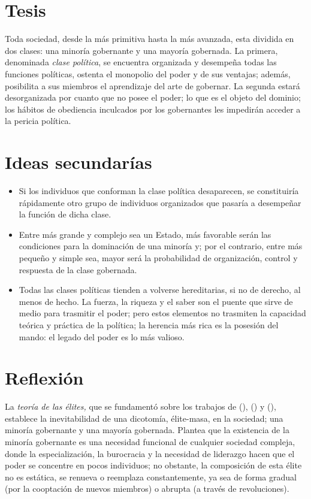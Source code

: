 \documentclass[
  letterpaper,
  DIV=11,
  numbers=noendperiod]{scrreprt}
\begin{document}
\section{Tesis}\label{tesis}

Toda sociedad, desde la más primitiva hasta la más avanzada, esta
dividida en dos clases: una minoría gobernante y una mayoría gobernada.
La primera, denominada \emph{clase política}, se encuentra organizada y
desempeña todas las funciones políticas, ostenta el monopolio del poder
y de sus ventajas; además, posibilita a sus miembros el aprendizaje del
arte de gobernar. La segunda estará desorganizada por cuanto que no
posee el poder; lo que es el objeto del dominio; los hábitos de
obediencia inculcados por los gobernantes les impedirán acceder a la
pericia política.

\section{Ideas secundarías}\label{ideas-secundaruxedas}

\begin{itemize}
\item
  Si los individuos que conforman la clase política desaparecen, se
  constituiría rápidamente otro grupo de individuos organizados que
  pasaría a desempeñar la función de dicha clase.
\item
  Entre más grande y complejo sea un Estado, más favorable serán las
  condiciones para la dominación de una minoría y; por el contrario,
  entre más pequeño y simple sea, mayor será la probabilidad de
  organización, control y respuesta de la clase gobernada.
\item
  Todas las clases políticas tienden a volverse hereditarias, si no de
  derecho, al menos de hecho. La fuerza, la riqueza y el saber son el
  puente que sirve de medio para trasmitir el poder; pero estos
  elementos no trasmiten la capacidad teórica y práctica de la política;
  la herencia más rica es la posesión del mando: el legado del poder es
  lo más valioso.
\end{itemize}

\section{Reflexión}\label{reflexiuxf3n}

La \emph{teoría de las élites,} que se fundamentó sobre los trabajos de
(),
() y
(), establece la inevitabilidad de
una dicotomía, élite-masa, en la sociedad; una minoría gobernante y una
mayoría gobernada. Plantea que la existencia de la minoría gobernante es
una necesidad funcional de cualquier sociedad compleja, donde la
especialización, la burocracia y la necesidad de liderazgo hacen que el
poder se concentre en pocos individuos; no obstante, la composición de
esta élite no es estática, se renueva o reemplaza constantemente, ya sea
de forma gradual (por la cooptación de nuevos miembros) o abrupta (a
través de revoluciones).
\end{document}
